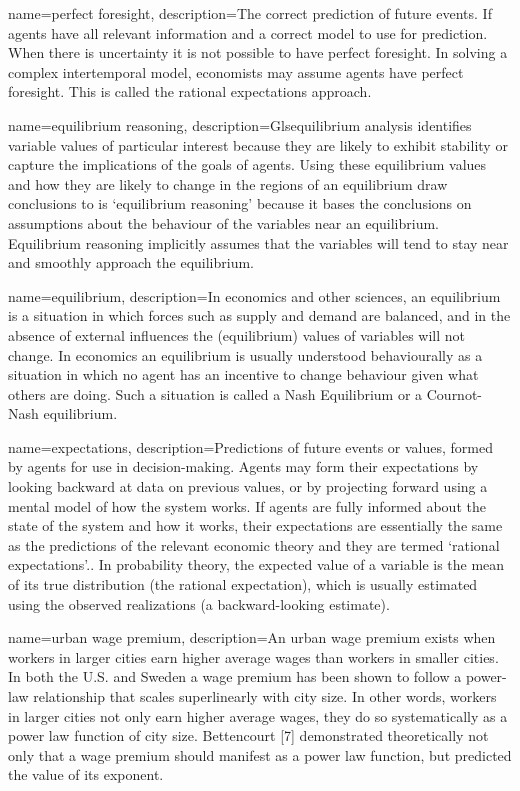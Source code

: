 {
name=perfect foresight,
description={The correct prediction of future events. If agents have  all relevant information and  a correct model to use for prediction. When there is uncertainty it is not possible to have perfect foresight. In solving a complex intertemporal model, economists may assume agents have perfect foresight. This is called the rational expectations approach.}
}

{
name=equilibrium reasoning,
description={Gls{equilibrium} analysis identifies variable values of particular interest because they are likely to exhibit stability or capture the implications of the goals of agents. Using these equilibrium values and how they are likely to change in the regions of an equilibrium draw conclusions to is `equilibrium reasoning' because it bases the conclusions on assumptions about the behaviour of the variables near an equilibrium. Equilibrium reasoning implicitly  assumes that the variables will tend to stay near and smoothly approach the equilibrium.}
}

{
name=equilibrium,
description={In economics and other sciences, an equilibrium is a situation in which forces such as supply and demand are balanced, and in the absence of external influences the (equilibrium) values of variables will not change. In economics an equilibrium is usually understood behaviourally as a situation in which no agent has an incentive to change behaviour given what others are doing. Such a situation is called a Nash Equilibrium or a Cournot-Nash equilibrium.}
}

{
name=expectations,
description={Predictions of future events or values, formed by agents for use in decision-making. Agents may form their expectations by looking backward at data on previous values, or by projecting forward using a mental model of how the system works. If agents are fully informed about the state of the system and how it works, their expectations are essentially the same as the predictions of the relevant economic theory and they are termed `rational expectations'.\cite{muthRationalExpectationsTheory1961}. In probability theory, the expected value of a variable is the mean of its true distribution (the rational expectation), which is usually estimated using the observed realizations (a backward-looking estimate).}
}

{
name=urban wage premium,
description={An urban wage premium exists when workers in larger cities earn higher average wages than workers in smaller cities. In both the U.S.  and Sweden a wage premium has been shown to follow a power-law relationship that scales superlinearly with city size. In other words, workers in larger cities not only earn higher average wages, they do so systematically as a power law function of city size. Bettencourt [7]  \cite{bettencourt-WHICH-REF-DO-WE-WANT} demonstrated theoretically not only that a wage premium should manifest as a power law function, but predicted the value of its exponent.}
}

